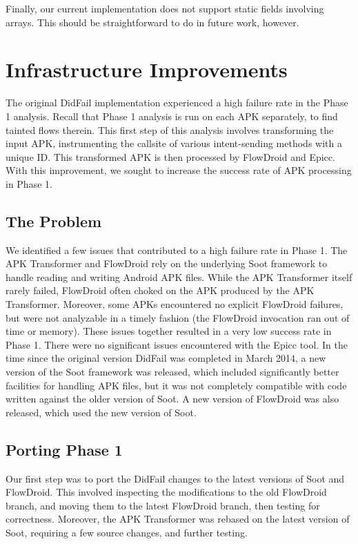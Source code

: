 Finally, our current implementation does not support static fields involving arrays. This should be straightforward to do in future work, however.


\chapter{Infrastructure Improvements}
\label{sec:infrastructure}
The original DidFail implementation experienced a high failure rate in the Phase 1 analysis.  Recall that Phase 1 analysis is run on each APK separately, to find tainted flows therein.  This first step of this analysis involves transforming the input APK, instrumenting the callsite of various intent-sending methods with a unique ID.  This transformed APK is then processed by FlowDroid and Epicc.  With this improvement, we sought to increase the success rate of APK processing in Phase 1.

\section{The Problem}
We identified a few issues that contributed to a high failure rate in Phase 1.  The APK Transformer and FlowDroid rely on the underlying Soot framework to handle reading and writing Android APK files. While the APK Transformer itself rarely failed, FlowDroid often choked on the APK produced by the APK Transformer.  Moreover, some APKs encountered no explicit FlowDroid failures, but were not analyzable in a timely fashion (the FlowDroid invocation ran out of time or memory).   These issues together resulted in a very low success rate in Phase 1.  There were no significant issues encountered with the Epicc tool.  In the time since the original version DidFail was completed in March 2014, a new version of the Soot framework was released, which included significantly better facilities for handling APK files, but it was not completely compatible with code written against the older version of Soot.  A new version of FlowDroid was also released, which used the new version of Soot.

\section{Porting Phase 1}
Our first step was to port the DidFail changes to the latest versions of Soot and FlowDroid.  This involved inspecting the modifications to the old FlowDroid branch, and moving them to the latest FlowDroid branch, then testing for correctness.  Moreover, the APK Transformer was rebased on the latest version of Soot, requiring a few source changes, and further testing.

